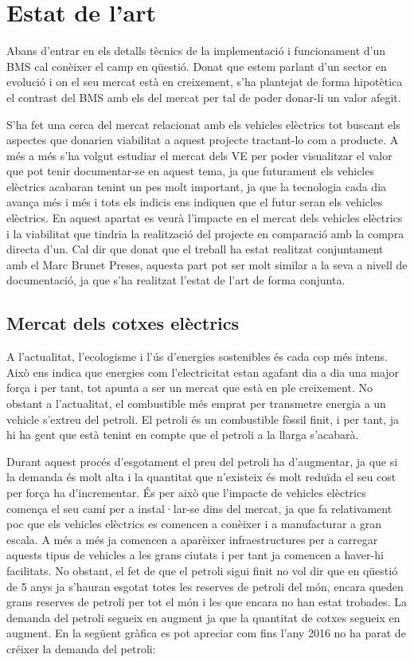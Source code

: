 \chapter{Estat de l'art}
\label{chap:pw}

Abans d'entrar en els detalls tècnics de la implementació i funcionament d'un BMS cal conèixer el camp en qüestió. Donat que estem parlant d'un sector en evolució i on el seu mercat està en creixement, s'ha plantejat de forma hipotètica el contrast del BMS  amb els del mercat per tal de poder donar-li un valor afegit. 

S'ha fet una cerca del mercat relacionat amb els vehicles elèctrics tot buscant els aspectes que donarien viabilitat a aquest projecte tractant-lo com a producte. A més a més s'ha volgut estudiar el mercat dels VE per poder visualitzar el valor que pot tenir documentar-se en aquest tema, ja que futurament els vehicles elèctrics acabaran tenint un pes molt important, ja que la tecnologia cada dia avança més i més i tots els indicis ens indiquen que el futur seran els vehicles elèctrics.
En aquest apartat es veurà l'impacte en el mercat dels vehicles elèctrics i la viabilitat que tindria la realització del projecte en comparació amb la compra directa d'un. Cal dir que donat que el treball ha estat realitzat conjuntament amb el Marc Brunet Preses, aquesta part pot ser molt similar a la seva a nivell de documentació, ja que s'ha realitzat l'estat de l'art de forma conjunta.

\section{Mercat dels cotxes elèctrics}

A l'actualitat, l'ecologisme i l'ús d'energies sostenibles és cada cop més intens. Això ens indica que energies com l'electricitat estan agafant dia a dia una major força i per tant, tot apunta a ser un mercat que està en ple creixement. No obstant a l'actualitat, el combustible més emprat per transmetre energia a un vehicle s'extreu del petroli. El petroli és un combustible fòssil finit, i per tant, ja hi ha gent que està tenint en compte que el petroli a la llarga s'acabarà. 

Durant aquest procés d'esgotament el preu del petroli ha d'augmentar, ja que si la demanda és molt alta i la quantitat que n'existeix és molt reduïda el seu cost per força ha d'incrementar. És per això que l'impacte de vehicles elèctrics comença el seu camí per a instal·lar-se dins del mercat, ja que fa relativament poc que els vehicles elèctrics es comencen a conèixer i a manufacturar a gran escala. A més a més ja comencen a aparèixer infraestructures per a carregar aquests tipus de vehicles a les grans ciutats i per tant ja comencen a haver-hi facilitats. 
\newline
No obstant, el fet de que el petroli sigui finit no vol dir que en qüestió de 5 anys ja s'hauran esgotat totes les reserves de petroli del món, encara queden grans reserves de petroli per tot el món i les que encara no han estat trobades. La demanda del petroli segueix en augment ja que la quantitat de cotxes segueix en augment. En la següent gràfica es pot apreciar com fins l'any 2016 no ha parat de créixer la demanda del petroli:
\bigskip

